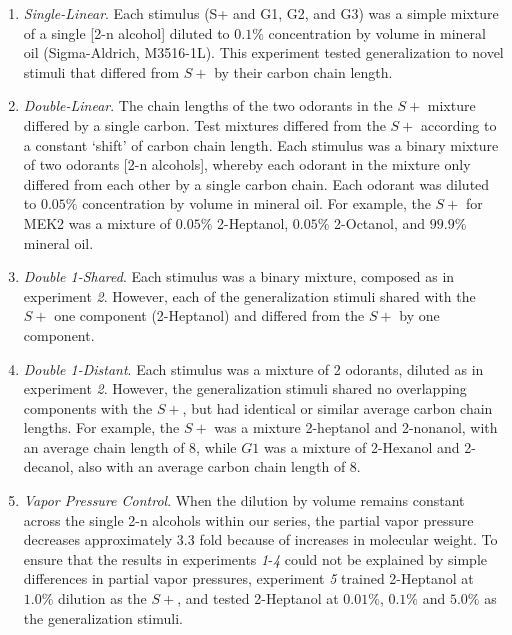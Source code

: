 \begin{enumerate}
\item \textit{Single-Linear}. Each stimulus (S+ and G1, G2, and G3) was a simple mixture of a single [2-n alcohol] diluted to $0.1\%$ concentration by volume in mineral oil (Sigma-Aldrich, M3516-1L). This experiment tested generalization to novel stimuli that differed from $S+$ by their carbon chain length.

\item \textit{Double-Linear}. The chain lengths of the two odorants in the $S+$ mixture differed by a single carbon.  Test mixtures differed from the $S+$ according to a constant `shift' of carbon chain length.  Each stimulus was a binary mixture of two odorants [2-n alcohols], whereby each odorant in the mixture only differed from each other by a single carbon chain. Each odorant was diluted to $0.05\%$ concentration by volume in mineral oil. For example, the $S+$ for MEK2 was a mixture of $0.05\%$ 2-Heptanol, $0.05\%$ 2-Octanol, and $99.9\%$ mineral oil.  

\item \textit{Double 1-Shared}. Each stimulus was a binary mixture, composed as in experiment \textit{2}. However, each of the generalization stimuli shared with the $S+$ one component (2-Heptanol) and differed from the $S+$ by one component. 

\item \textit{Double 1-Distant}. Each stimulus was a mixture of 2 odorants, diluted as in experiment \textit{2}. However, the generalization stimuli shared no overlapping components with the $S+$, but had identical or similar average carbon chain lengths. For example, the $S+$ was a mixture 2-heptanol and 2-nonanol, with an average chain length of 8, while $G1$ was a mixture of 2-Hexanol and 2-decanol, also with an average carbon chain length of 8.

\item \textit{Vapor Pressure Control}. When the dilution by volume remains constant across the single 2-n alcohols within our series, the partial vapor pressure decreases approximately 3.3 fold because of increases in molecular weight. To ensure that the results in experiments \textit{1}-\textit{4} could not be explained by simple differences in partial vapor pressures, experiment \textit{5} trained 2-Heptanol at $1.0\%$ dilution as the $S+$, and tested 2-Heptanol at $0.01\%$, $0.1\%$ and $5.0\%$ as the generalization stimuli.

\end{enumerate}

